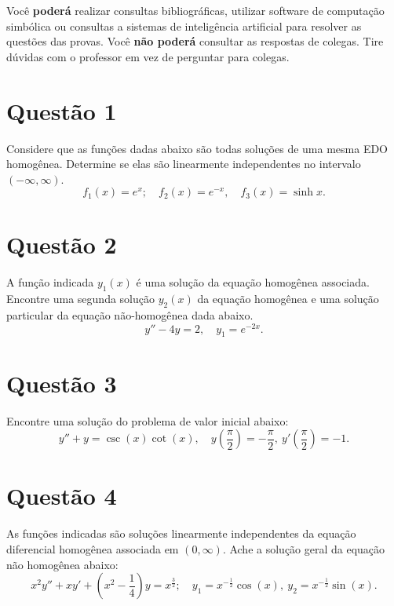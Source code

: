 \documentclass[oneside,12pt,a4paper]{article}
\begin{document}
    Você \textbf{poderá} realizar consultas bibliográficas, utilizar software de computação simbólica ou consultas a sistemas de inteligência artificial para resolver as questões das provas. Você \textbf{não poderá} consultar as respostas de colegas. Tire dúvidas com o professor em vez de perguntar para colegas.

    \pagebreak

    \section*{Questão 1}
    Considere que as funções dadas abaixo são todas soluções de uma mesma EDO homogênea. Determine se elas são linearmente independentes no intervalo $(-\infty, \infty)$.
    $$
        f_1(x) = e^x; \quad f_2(x) = e^{-x}, \quad f_3(x) = \sinh x.
    $$

    \section*{Questão 2}
     A função indicada $y_1(x)$ é uma solução da equação homogênea associada. Encontre uma segunda solução $y_2(x)$ da equação homogênea e uma solução particular da equação não-homogênea dada abaixo.
     $$
        y'' - 4y = 2,\quad y_1 = e^{-2x}.
     $$

    \section*{Questão 3}
    Encontre uma solução do problema de valor inicial abaixo:
    $$
        y''+y=\csc(x)\cot(x),\quad y\left(\frac{\pi}{2}\right)=-\frac{\pi}{2},~y'\left(\frac{\pi}{2}\right)=-1.
    $$

    \section*{Questão 4}
    As funções indicadas são soluções linearmente independentes da equação diferencial homogênea associada em $(0,\infty)$. Ache a solução geral da equação não homogênea abaixo:
    $$
        x^2y''+xy'+\left(x^2-\frac{1}{4}\right)y=x^\frac{3}{2};\quad y_1=x^{-\frac{1}{2}}\cos(x),~y_2=x^{-\frac{1}{2}}\sin(x).
    $$
\end{document}
